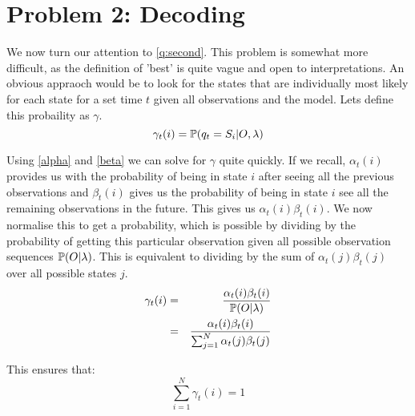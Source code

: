\section{Problem 2: Decoding}
We now turn our attention to \ref{q:second}. This problem is somewhat more difficult, as the definition of 'best' is quite vague and open to interpretations. An obvious appraoch would be to look for the states that are individually most likely for each state for a set time $t$ given all observations and the model. Lets define this probaility as $\gamma$.
\begin{equation}
    \label{gamma}
    \gamma_t(i) = \mathbb{P} (q_t = S_i | O, \lambda)
\end{equation}

Using \ref{alpha} and \ref{beta} we can solve for $\gamma$ quite quickly. If we recall, $\alpha_t(i)$ provides us with the probability of being in state $i$ after seeing all the previous observations and $\beta_t(i)$ gives us the probability of being in state $i$ see all the remaining observations in the future. This gives us $\alpha_t(i) \beta_t(i)$. We now normalise this to get a probability, which is possible by dividing by the probability of getting this particular observation given all possible observation sequences $\mathbb{P} (O|\lambda)$. This is equivalent to dividing by the sum of $\alpha_t(j) \beta_t(j)$ over all possible states $j$.
\begin{eqnarray}
    \gamma_t(i) & = &  \dfrac{\alpha_t(i) \beta_t(i)}{\mathbb{P} (O|\lambda)} \\
                & = &  \dfrac{\alpha_t(i) \beta_t(i)}{\sum_{j=1}^N \alpha_t(j) \beta_t(j)}
\end{eqnarray}


This ensures that:
\begin{equation}
    \sum_{i=1}^N \gamma_t(i) = 1
\end{equation}

